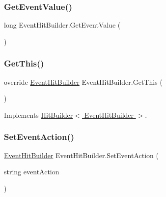 \mbox{\label{class_event_hit_builder_a1ac04b1d7ab4ca075b21cb65a8be7660}} 
\subsubsection{\texorpdfstring{Get\+Event\+Value()}{GetEventValue()}}
{\footnotesize\ttfamily long Event\+Hit\+Builder.\+Get\+Event\+Value (\begin{DoxyParamCaption}{ }\end{DoxyParamCaption})}

\mbox{\label{class_event_hit_builder_a0eade8be0a38bfbdaa0f2d0c3dec59ee}} 
\subsubsection{\texorpdfstring{Get\+This()}{GetThis()}}
{\footnotesize\ttfamily override \hyperlink{class_event_hit_builder}{Event\+Hit\+Builder} Event\+Hit\+Builder.\+Get\+This (\begin{DoxyParamCaption}{ }\end{DoxyParamCaption})\hspace{0.3cm}{\ttfamily [virtual]}}



Implements \hyperlink{class_hit_builder_a4276c57427406e264dc33f8c900ad530}{Hit\+Builder$<$ Event\+Hit\+Builder $>$}.

\mbox{\label{class_event_hit_builder_a0a693931c5d080312b87094a1d8f852a}} 
\subsubsection{\texorpdfstring{Set\+Event\+Action()}{SetEventAction()}}
{\footnotesize\ttfamily \hyperlink{class_event_hit_builder}{Event\+Hit\+Builder} Event\+Hit\+Builder.\+Set\+Event\+Action (\begin{DoxyParamCaption}\item[{string}]{event\+Action }\end{DoxyParamCaption})}

